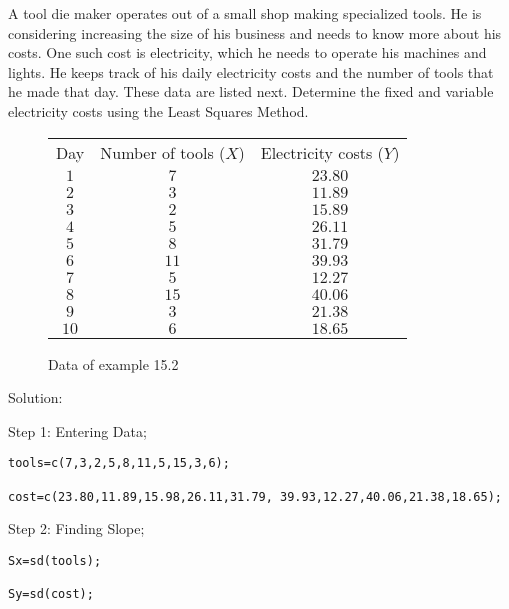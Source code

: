 \begin{example}
A tool die maker operates out of a small shop making specialized tools. He is considering increasing the size of his business and needs to know more about his costs. One such cost is electricity, which he needs to operate his machines and lights. He keeps track of his daily electricity costs and the number of tools that he made that day. These data are listed next. Determine the fixed and variable electricity costs using the Least Squares Method.

\begin{center}
\begin{figure}[H]
\centering
\begin{tabular}{ c c c }
Day & Number of tools ($X$) & Electricity costs ($Y$)\\
$1$ & $7$ & $23.80$\\
$2$ & $3$ & $11.89$\\
$3$ & $2$ & $15.89$\\
$4$ & $5$ & $26.11$\\
$5$ & $8$ & $31.79$\\
$6$ & $11$ & $39.93$\\
$7$ & $5$ & $12.27$\\
$8$ & $15$ & $40.06$\\
$9$ & $3$ & $21.38$\\
$10$ & $6$ & $18.65$\\
\end{tabular}
\caption{Data of example 15.2}
\end{figure}
\end{center}
\vspace{-0.75cm}

Solution:

Step 1: Entering Data;

\begin{tcolorbox}[colback=gray!10, colframe=gray!50, arc=2mm]
\begin{verbatim}
tools=c(7,3,2,5,8,11,5,15,3,6);

cost=c(23.80,11.89,15.98,26.11,31.79, 39.93,12.27,40.06,21.38,18.65);
\end{verbatim}
\end{tcolorbox}

Step 2: Finding Slope;

\begin{tcolorbox}[colback=gray!10, colframe=gray!50, arc=2mm]
\begin{verbatim}
Sx=sd(tools); 

Sy=sd(cost); 


\end{verbatim}
\end{tcolorbox}
\end{example}

